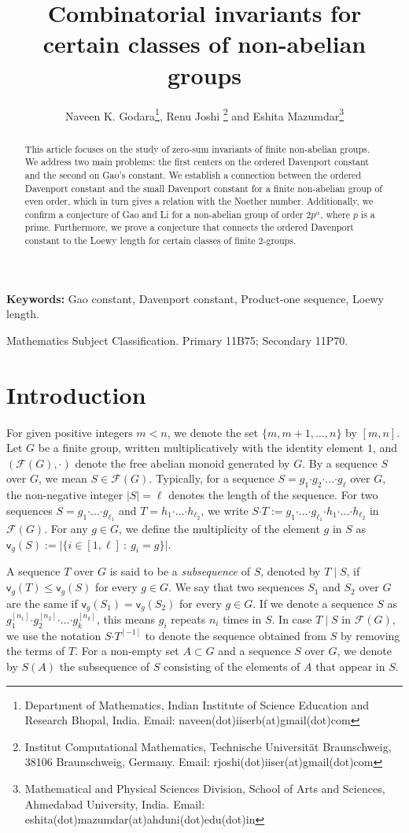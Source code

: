 \documentclass[a4paper,11pt]{article}
\title{Combinatorial invariants for certain classes of non-abelian groups}
\author{Naveen K. Godara\footnote{Department of Mathematics, Indian Institute of Science Education and Research Bhopal, India. Email: naveen(dot)iiserb(at)gmail(dot)com}, Renu Joshi \footnote{Institut Computational Mathematics, Technische Universität Braunschweig,
38106 Braunschweig, Germany. Email: rjoshi(dot)iiser(at)gmail(dot)com} and Eshita Mazumdar\footnote{Mathematical and Physical Sciences Division, School of Arts and Sciences, Ahmedabad University, India. Email: eshita(dot)mazumdar(at)ahduni(dot)edu(dot)in}  }
\date{}
\numberwithin{equation}{section}
\newcommand{\bdot}{\boldsymbol{\cdot}}
\newcommand{\no}{\noindent}
\begin{document}
\maketitle
\begin{abstract}
\no This article focuses on the study of zero-sum invariants of finite non-abelian groups. We address two main problems: the first centers on the ordered Davenport constant and the second on Gao's constant. We establish a connection between the ordered Davenport constant and the small Davenport constant for a finite non-abelian group of even order, which in turn gives a relation with the Noether number. Additionally, we confirm a conjecture of Gao and Li for a non-abelian group of order $2p^{\alpha}$, where $p$ is a prime. Furthermore, we prove a conjecture that connects the ordered Davenport constant to the Loewy length for certain classes of finite $2$-groups.
\end{abstract}


\no \textbf{Keywords:}
Gao constant, Davenport constant, Product-one sequence, Loewy length.
 
\smallskip

\no 2020 Mathematics Subject Classification. Primary 11B75; Secondary 11P70.

\section{Introduction}
For given positive integers $m<n$, we denote the set $\{m,m+1,\ldots,n\}$ by $[m,n].$ 
Let $G$ be a finite group, written multiplicatively with the identity element $1$, and $({\mathcal{F}}(G), \bdot)$ denote the free abelian monoid generated by $G.$ By a sequence $S$ over $G$, we mean $S\in{\mathcal{F}}(G).$ Typically, for a sequence $S=g_1\bdot g_2\bdot \dotsc \bdot g_{\ell}$ over $G$, the non-negative integer $|S|=\ell$ denotes the length of the sequence. For two sequences $S = g_1 \bdot \dotsc \bdot g_{\ell_1}$ and $T = h_1 \bdot \dotsc \bdot h_{\ell_2}$, we write $S \bdot T := g_1 \bdot \dotsc \bdot g_{\ell_1} \bdot h_1 \bdot \dotsc \bdot h_{\ell_2}$ in $\mathcal{F}(G)$.
 For any $g \in G$, we define the multiplicity of the element $g$ in $S$ as ${\mathsf{v}}_{g}(S) := \lvert \{ i \in [1,\ell] ~:~ g_i = g \}|. $

A sequence $T$ over $G$ is said to be a {\it subsequence} of $S$, denoted by $T \mid S$, if ${\mathsf{v}}_{g}(T) \leq {\mathsf{v}}_{g}(S)$ for every $g \in G$. We say that two sequences $S_1$ and $S_2$ over $G$ are the same if ${\mathsf{v}}_{g}(S_1)={\mathsf{v}}_{g}(S_2)$ for every $g \in G$. If we denote a sequence $S$ as $g_1^{[n_1]}\bdot g_2^{[n_2]}\bdot \dotsc \bdot g_{k}^{[n_k]}$, this means $g_i$ repeats $n_i$ times in $S.$ In case $T \mid S$ in $\mathcal{F}(G)$, we use the notation $S \bdot T^{[-1]}$ to denote the sequence obtained from $S$ by removing the terms of $T$. For a non-empty set $A\subset G$ and a sequence $S$ over $G$, we denote by $S(A)$ the subsequence of $S$ consisting of the elements of $A$ that appear in $S.$
\end{document}
